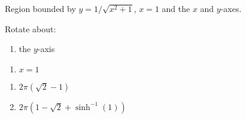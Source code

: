 {Region bounded by $y=1/\sqrt{x^2+1}$, $x=1$ and the $x$ and $y$-axes.

Rotate about:

\noindent%
\begin{minipage}[t]{.5\linewidth}
\begin{enumerate}
\item		the $y$-axis
\end{enumerate}
\end{minipage}
\begin{minipage}[t]{.5\linewidth}
\begin{enumerate}\addtocounter{enumii}{1}
\item		$x=1$
\end{enumerate}
\end{minipage}
}
{\begin{enumerate}
\item $2\pi(\sqrt{2}-1)$
\item $2\pi(1-\sqrt{2}+\sinh^{-1} (1))$
\end{enumerate}
}
